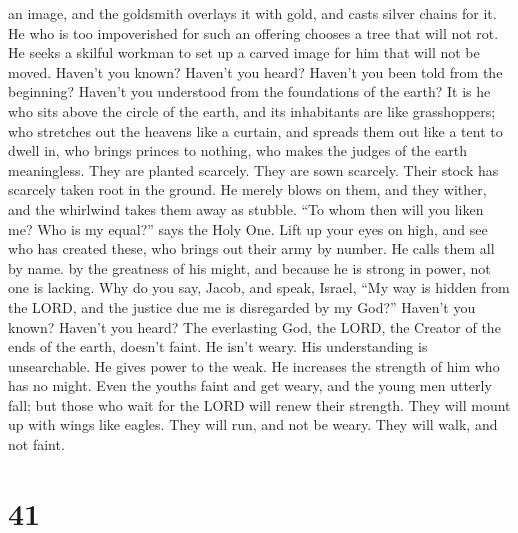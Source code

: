 an image, and the goldsmith overlays it with gold, and casts silver
chains for it.  He who is too impoverished for such an
offering chooses a tree that will not rot. He seeks a skilful workman to
set up a carved image for him that will not be moved. 
Haven't you known? Haven't you heard? Haven't you been told from the
beginning? Haven't you understood from the foundations of the earth?
 It is he who sits above the circle of the earth, and its
inhabitants are like grasshoppers; who stretches out the heavens like a
curtain, and spreads them out like a tent to dwell in,  who
brings princes to nothing, who makes the judges of the earth
meaningless.  They are planted scarcely. They are sown
scarcely. Their stock has scarcely taken root in the ground. He merely
blows on them, and they wither, and the whirlwind takes them away as
stubble.  ``To whom then will you liken me? Who is my
equal?'' says the Holy One.  Lift up your eyes on high, and
see who has created these, who brings out their army by number. He calls
them all by name. by the greatness of his might, and because he is
strong in power, not one is lacking.  Why do you say,
Jacob, and speak, Israel, ``My way is hidden from the LORD, and the
justice due me is disregarded by my God?''  Haven't you
known? Haven't you heard? The everlasting God, the LORD, the Creator of
the ends of the earth, doesn't faint. He isn't weary. His understanding
is unsearchable.  He gives power to the weak. He increases
the strength of him who has no might.  Even the youths
faint and get weary, and the young men utterly fall;  but
those who wait for the LORD will renew their strength. They will mount
up with wings like eagles. They will run, and not be weary. They will
walk, and not faint.

\hypertarget{section-39}{%
\section{41}\label{section-39}}

